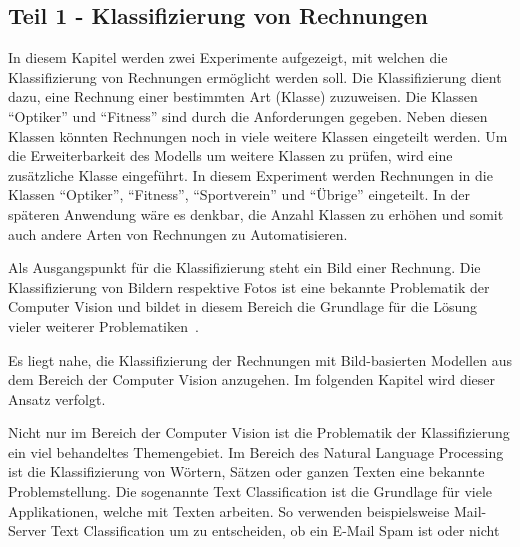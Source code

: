 \subsection{Teil 1 - Klassifizierung von Rechnungen}

In diesem Kapitel werden zwei Experimente aufgezeigt, mit welchen die Klassifizierung von Rechnungen ermöglicht werden soll. Die Klassifizierung dient dazu, eine Rechnung einer bestimmten Art (Klasse) zuzuweisen. Die Klassen \enquote{Optiker} und \enquote{Fitness} sind durch die Anforderungen gegeben. Neben diesen Klassen könnten Rechnungen noch in viele weitere Klassen eingeteilt werden. Um die Erweiterbarkeit des Modells um weitere Klassen zu prüfen, wird eine zusätzliche Klasse eingeführt. In diesem Experiment werden Rechnungen in die Klassen \enquote{Optiker}, \enquote{Fitness}, \enquote{Sportverein} und \enquote{Übrige} eingeteilt. In der späteren Anwendung wäre es denkbar, die Anzahl Klassen zu erhöhen und somit auch andere Arten von Rechnungen zu Automatisieren.

Als Ausgangspunkt für die Klassifizierung steht ein Bild einer Rechnung. Die Klassifizierung von Bildern respektive Fotos ist eine bekannte Problematik der Computer Vision und bildet in diesem Bereich die Grundlage für die Lösung vieler weiterer Problematiken~\autocite{StanfordGithubClassification}. 


Es liegt nahe, die Klassifizierung der Rechnungen mit Bild-basierten Modellen aus dem Bereich der Computer Vision anzugehen. Im folgenden Kapitel wird dieser Ansatz verfolgt.

Nicht nur im Bereich der Computer Vision ist die Problematik der Klassifizierung ein viel behandeltes Themengebiet. Im Bereich des Natural Language Processing ist die Klassifizierung von Wörtern, Sätzen oder ganzen Texten eine bekannte Problemstellung. Die sogenannte Text Classification ist die Grundlage für viele Applikationen, welche mit Texten arbeiten. So verwenden beispielsweise Mail-Server Text Classification um zu entscheiden, ob ein E-Mail Spam ist oder nicht~\autocite{GoogleTextClassification}

